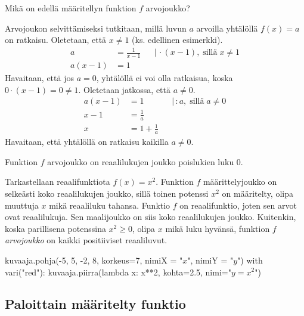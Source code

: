 \newpage %
\begin{esimerkki}
	Mikä on edellä määritellyn funktion $f$ arvojoukko?
	\begin{esimratk}
		Arvojoukon selvittämiseksi tutkitaan, millä luvun $a$ arvoilla
		yhtälöllä $f(x) = a$ on ratkaisu. Oletetaan, että $x \neq 1$ (ks. edellinen esimerkki).
		\begin{align*}
			a &= \frac{1}{x-1} & &| \, \cdot (x-1), \; \text{sillä} \; x \neq 1 \\
			a(x-1) &= 1
		\end{align*}
		Havaitaan, että jos $a = 0$, yhtälöllä ei voi olla ratkaisua, koska $0 \cdot (x-1) = 0 \neq 1$.
		Oletetaan jatkossa, että $a \neq 0$.
		\begin{align*}
			a(x-1) &= 1 & &| \, : a, \; \text{sillä} \; a \neq 0 \\
			x-1 &= \frac{1}{a} \\
			x &= 1+\frac{1}{a}
		\end{align*}
		Havaitaan, että yhtälöllä on ratkaisu kaikilla $a \neq 0$.
	\end{esimratk}
	\begin{esimvast}
		Funktion $f$ arvojoukko on reaalilukujen joukko poislukien luku $0$.
	\end{esimvast}
\end{esimerkki}

\begin{esimerkki}
	Tarkastellaan reaalifunktiota $f(x)=x^2$. Funktion $f$ määrittelyjoukko on selkeästi koko reaalilukujen joukko, sillä toinen potenssi $x^2$ on määritelty, olipa muuttuja $x$ mikä reaaliluku tahansa. Funktio $f$ on reaalifunktio, joten sen arvot ovat reaalilukuja. Sen maalijoukko on siis koko reaalilukujen joukko. Kuitenkin, koska parillisena potenssina $x^{2}\geq0$, olipa $x$ mikä luku hyvänsä, funktion $f$ \textit{arvojoukko} on kaikki positiiviset reaaliluvut.
	
\begin{center}
\begin{kuva}
	kuvaaja.pohja(-5, 5, -2, 8, korkeus=7, nimiX = "$x$", nimiY = "$y$")
	with vari("red"): kuvaaja.piirra(lambda x: x**2, kohta=2.5, nimi="$y=x^2$")
\end{kuva}
\end{center}

\end{esimerkki}
	
\subsection*{Paloittain määritelty funktio}

